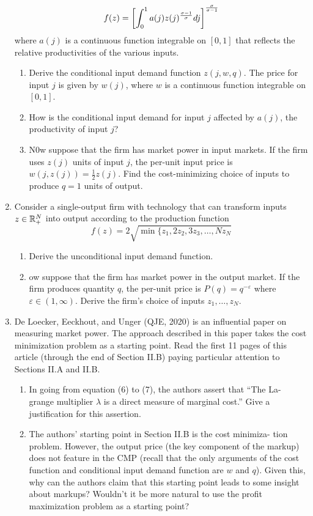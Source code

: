 \documentclass[12pt]{article}
\begin{document}
\begin{enumerate}
	\[
	f(z) = \left[ \int_0^1 a(j) z(j)^{\frac{\sigma-1}{\sigma}} dj \right]^{\frac{\sigma}{\sigma-1}} 
	\]
	where $a(j)$ is a continuous function integrable on $[0, 1]$ that reflects the relative productivities of the various inputs.
	\begin{enumerate}
		\item Derive the conditional input demand function $z(j, w, q)$. The price for input $j$ is given by $w(j)$, where $w$ is a continuous function integrable on $[0, 1]$.
		\item How is the conditional input demand for input $j$ affected by $a(j)$, the productivity of input $j$?
		\item N0w suppose that the firm has market power in input markets. If the firm uses $z(j)$ units of input $j$, the per-unit input price is $w(j,z(j)) = \frac{1}{2} z(j)$. Find the cost-minimizing choice of inputs to produce $q = 1$ units of output.
	\end{enumerate}
	\item Consider a single-output firm with technology that can transform inputs $z \in \mathbb{R}^N_+$ into output according to the production function
	\[
	f(z) = 2\sqrt{\min\{z_1,2z_2,3z_3,\dots,Nz_N}
	\]
	\begin{enumerate}
		\item Derive the unconditional input demand function.
		\item ow suppose that the firm has market power in the output market. If the firm produces quantity $q$, the per-unit price is $P(q) = q^{-\varepsilon}$ where $\varepsilon \in (1,\infty)$. Derive the firm's choice of inputs $z_1,\dots,z_N$.
	\end{enumerate}
	\item De Loecker, Eeckhout, and Unger (QJE, 2020) is an influential paper on measuring market power. The approach described in this paper takes the cost minimization problem as a starting point. Read the first 11 pages of this article (through the end of Section II.B) paying particular attention to Sections II.A and II.B.
	\begin{enumerate}
		\item In going from equation (6) to (7), the authors assert that ``The La- grange multiplier $\lambda$ is a direct measure of marginal cost.'' Give a justification for this assertion.
		\item The authors’ starting point in Section II.B is the cost minimiza- tion problem. However, the output price (the key component of the markup) does not feature in the CMP (recall that the only arguments of the cost function and conditional input demand function are $w$ and $q$). Given this, why can the authors claim that this starting point leads to some insight about markups? Wouldn’t it be more natural to use the profit maximization problem as a starting point?
	\end{enumerate}
\end{enumerate}
\end{document}
